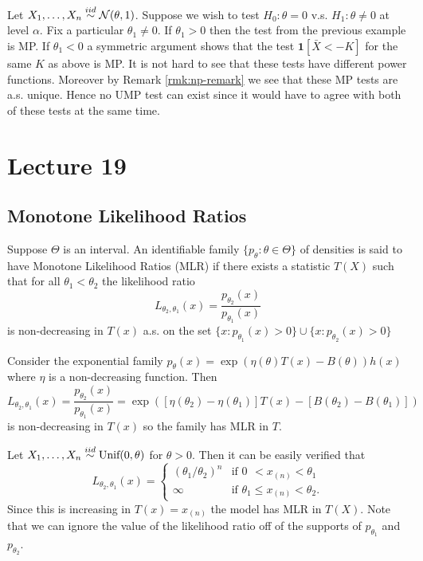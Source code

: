 \begin{example}
	Let $X_1, \dots, X_n \overset{iid}{\sim} \mathcal{N}(\theta, 1)$. Suppose we wish to test $H_0 : \theta = 0$ v.s. $H_1 : \theta \neq 0$ at level $\alpha$. Fix a particular $\theta_1 \neq 0$. If $\theta_1 > 0$ then the test from the previous example is MP. If $\theta_1 < 0$ a symmetric argument shows that the test $\mathbf{1}[\bar X < -K]$ for the same $K$ as above is MP. It is not hard to see that these tests have different power functions. Moreover by Remark \ref{rmk:np-remark}  we see that these MP tests are a.s. unique. Hence no UMP test can exist since it would have to agree with both of these tests at the same time.
\end{example}




\newpage
\section{Lecture 19}


\subsection{Monotone Likelihood Ratios}


\begin{definition}
	Suppose $\Theta$ is an interval. An identifiable family $\{p_\theta : \theta \in \Theta \}$ of densities is said to have Monotone Likelihood Ratios (MLR) if there exists a statistic $T(X)$ such that for all $\theta_1 < \theta_2$ the likelihood ratio \[
		L_{\theta_2,\theta_1}(x) = \frac{p_{\theta_2}(x)}{p_{\theta_1}(x)}
	\] is non-decreasing in $T(x)$ a.s. on the set $\{x : p_{\theta_1}(x) > 0\} \cup \{x : p_{\theta_2}(x) > 0\}$
\end{definition}

\begin{example}
	Consider the exponential family $p_\theta(x) = \exp(\eta(\theta)T(x) - B(\theta))h(x)$ where $\eta$ is a non-decreasing function. Then \[
		L_{\theta_2,\theta_1}(x) = \frac{p_{\theta_2}(x)}{p_{\theta_1}(x)} = \exp([\eta(\theta_2) - \eta(\theta_1)]T(x) - [B(\theta_2) - B(\theta_1)])
	\] is non-decreasing in $T(x)$ so the family has MLR in $T$.
\end{example}

\begin{example}
	Let $X_1, \dots, X_n \overset{iid}{\sim} \text{Unif}(0, \theta)$ for $\theta > 0$. Then it can be easily verified that \[
		L_{\theta_2, \theta_1}(x) = \begin{cases}
			(\theta_1 / \theta_2)^n & \text{if } 0_{\phantom{1}} < x_{(n)} < \theta_1 \\
			\infty &\text{if } \theta_1 \le x_{(n)} < \theta_2.
		\end{cases}
	\] Since this is increasing in $T(x) = x_{(n)}$ the model has MLR in $T(X)$. Note that we can ignore the value of the likelihood ratio off of the supports of $p_{\theta_1}$ and $p_{\theta_2}$. 
\end{example}

